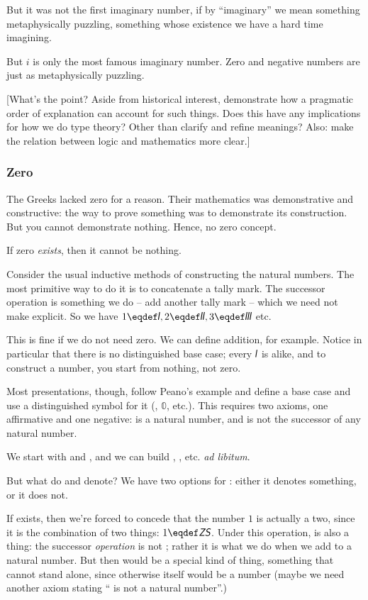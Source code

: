\documentclass{article}
\begin{document}
But it was not the first imaginary number, if by ``imaginary'' we mean
something metaphysically puzzling, something whose existence we have a
hard time imagining.

But \(i\) is only the most famous imaginary number. Zero and negative
numbers are just as metaphysically puzzling.

[What's the point? Aside from historical interest, demonstrate how a
  pragmatic order of explanation can account for such things. Does
  this have any implications for how we do type theory? Other than
  clarify and refine meanings?  Also: make the relation between logic and mathematics more clear.]

\subsubsection{Zero}

The Greeks lacked zero for a reason. Their mathematics was
demonstrative and constructive: the way to prove something was to
demonstrate its construction. But you cannot demonstrate nothing.
Hence, no zero concept.

If zero \textit{exists}, then it cannot be nothing.

Consider the usual inductive methods of constructing the natural
numbers. The most primitive way to do it is to concatenate a tally
mark. The successor operation is something we do -- add another tally
mark -- which we need not make explicit. So we have \(1\eqdef\Stroke{1},
2\eqdef\Stroke{2}, 3\eqdef\Stroke{3}\) etc.

This is fine if we do not need zero. We can define addition, for
example. Notice in particular that there is no distinguished base
case; every \(\Stroke{1}\) is alike, and to construct a number, you
start from nothing, not zero.

Most presentations, though, follow Peano's example and define a base
case and use a distinguished symbol for it (\Znat, \(\mathbb{0}\),
etc.). This requires two axioms, one affirmative and one negative:
\Znat{} is a natural number, and \Znat{} is not the successor of any
natural number.

We start with \Znat{} and \Snat{}, and we can build \ZS, \ZSS, etc.
\textit{ad libitum}.

But what do \Znat{} and \Snat{} denote? We have two options for \Znat:
either it denotes something, or it does not.

If \Znat{} exists, then we're forced to concede that the number \(1\)
is actually a two, since it is the combination of two things:
\(1\eqdef \ZS\). Under this operation, \Snat{} is also a thing:
the successor \textit{operation} is not \Snat; rather it is what we do
when we add \Snat{} to a natural number. But then \Snat{} would be a
special kind of thing, something that cannot stand alone, since
otherwise \Snat{} itself would be a number (maybe we need another
axiom stating ``\Snat{} is not a natural number''.)
\end{document}
